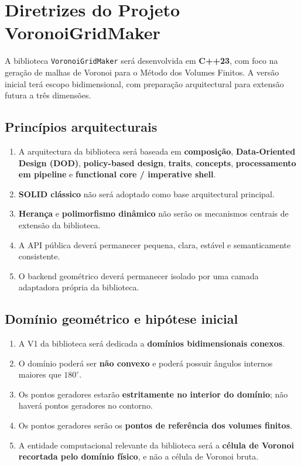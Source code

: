 \section{Diretrizes do Projeto VoronoiGridMaker}
\label{sec:vgm_project_guidelines}

A biblioteca \texttt{VoronoiGridMaker} será desenvolvida em \textbf{C++23}, com foco na geração de malhas de Voronoi para o Método dos Volumes Finitos. A versão inicial terá escopo bidimensional, com preparação arquitectural para extensão futura a três dimensões.

\subsection{Princípios arquitecturais}

\begin{enumerate}
    \item A arquitectura da biblioteca será baseada em \textbf{composição}, \textbf{Data-Oriented Design (DOD)}, \textbf{policy-based design}, \textbf{traits}, \textbf{concepts}, \textbf{processamento em pipeline} e \textbf{functional core / imperative shell}.
    \item \textbf{SOLID clássico} não será adoptado como base arquitectural principal.
    \item \textbf{Herança} e \textbf{polimorfismo dinâmico} não serão os mecanismos centrais de extensão da biblioteca.
    \item A API pública deverá permanecer pequena, clara, estável e semanticamente consistente.
    \item O backend geométrico deverá permanecer isolado por uma camada adaptadora própria da biblioteca.
\end{enumerate}

\subsection{Domínio geométrico e hipótese inicial}

\begin{enumerate}
    \item A V1 da biblioteca será dedicada a \textbf{domínios bidimensionais conexos}.
    \item O domínio poderá ser \textbf{não convexo} e poderá possuir ângulos internos maiores que $180^\circ$.
    \item Os pontos geradores estarão \textbf{estritamente no interior do domínio}; não haverá pontos geradores no contorno.
    \item Os pontos geradores serão os \textbf{pontos de referência dos volumes finitos}.
    \item A entidade computacional relevante da biblioteca será a \textbf{célula de Voronoi recortada pelo domínio físico}, e não a célula de Voronoi bruta.
\end{enumerate}

